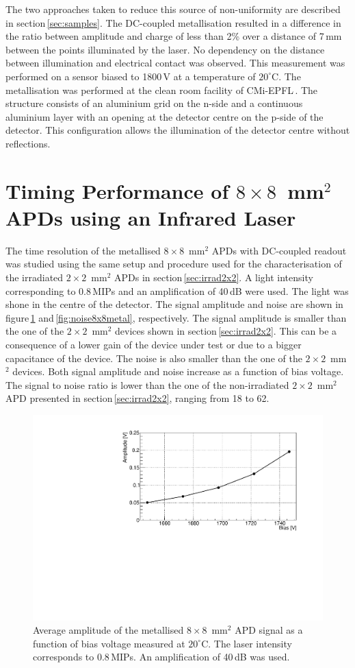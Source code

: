 \documentclass{article}
\begin{document}
The two approaches taken to reduce this source of non-uniformity are described in section\,\ref{sec:samples}.
The DC-coupled metallisation resulted in a difference in the ratio between amplitude and charge of less than 2\% over a distance of 7\,mm between the points illuminated by the laser.
No dependency on the distance between illumination and electrical contact was observed.
This measurement was performed on a sensor biased to 1800\,V at a temperature of $20^\circ$C.
The metallisation was performed at the clean room facility of CMi-EPFL\,\cite{cmi}.
The structure consists of an aluminium grid on the n-side and a continuous aluminium layer with an opening at the detector centre on the p-side of the detector.
This configuration allows the illumination of the detector centre without reflections.

\section{Timing Performance of $8 \times 8$~mm$^2$ APDs using an Infrared Laser}
\label{sec:timing8x8laser}

The time resolution of the metallised $8 \times 8$~mm$^2$ APDs with DC-coupled readout was studied using the same setup and procedure used for the characterisation of the irradiated $2 \times 2$~mm$^2$ APDs in section\,\ref{sec:irrad2x2}.
A light intensity corresponding to 0.8\,MIPs and an amplification of 40\,dB were used.
The light was shone in the centre of the detector.
The signal amplitude and noise are shown in figure\,\ref{fig:ampli8x8metal} and\,\ref{fig:noise8x8metal}, respectively.
The signal amplitude is smaller than the one of the $2 \times 2$~mm$^2$ devices shown in section\,\ref{sec:irrad2x2}.
This can be a consequence of a lower gain of the device under test or due to a bigger capacitance of the device.
The noise is also smaller than the one of the $2 \times 2$~mm$^2$ devices.
Both signal amplitude and noise increase as a function of bias voltage.
The signal to noise ratio is lower than the one of the non-irradiated $2 \times 2$~mm$^2$ APD presented in section\,\ref{sec:irrad2x2}, ranging from 18 to 62.

\begin{figure}
  \centering
  \includegraphics[width = 0.6 \textwidth]{ampli8x8metal}
  \caption{Average amplitude of the metallised $8 \times 8$~mm$^2$ APD signal as a function of bias voltage measured at $20^\circ$C. The laser intensity corresponds to 0.8\,MIPs. An amplification of 40\,dB was used.}
  \label{fig:ampli8x8metal}
\end{figure}
\end{document}
